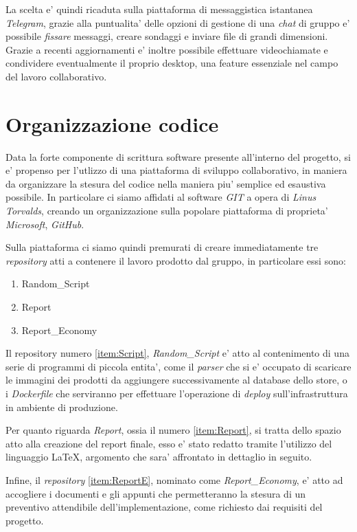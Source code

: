 \documentclass[a4paper]{report}
\begin{document}
		La scelta e' quindi ricaduta sulla piattaforma di messaggistica istantanea \emph{Telegram}, grazie alla
		puntualita' delle opzioni di gestione di una \emph{chat} di gruppo e' possibile \emph{fissare} messaggi, creare
		sondaggi e inviare file di grandi dimensioni. Grazie a recenti aggiornamenti e' inoltre possibile effettuare
		videochiamate e condividere eventualmente il proprio desktop, una feature essenziale nel campo del lavoro
		collaborativo.
	\section{Organizzazione codice}
		Data la forte componente di scrittura software presente all'interno del progetto, si e' propenso per l'utlizzo
		di una piattaforma di sviluppo collaborativo, in maniera da organizzare la stesura del codice nella maniera piu'
		semplice ed esaustiva possibile. In particolare ci siamo affidati al software \emph{GIT} a opera di \emph{Linus
		Torvalds}, creando un organizzazione sulla popolare piattaforma di proprieta' \emph{Microsoft}, \emph{GitHub}.

		Sulla piattaforma ci siamo quindi premurati di creare immediatamente tre \emph{repository} atti a contenere il
		lavoro prodotto dal gruppo, in particolare essi sono:
		\begin{enumerate}
			\item Random\_Script\label{item:Script}
			\item Report\label{item:Report}
			\item Report\_Economy\label{item:ReportE}
		\end{enumerate}

		Il repository numero \ref{item:Script}{, \emph{Random\_Script}} e' atto al contenimento di una serie di
		programmi di piccola entita', come il \emph{parser} che si e' occupato di scaricare le immagini dei prodotti da
		aggiungere successivamente al database dello store, o i \emph{Dockerfile} che serviranno per effettuare l'operazione di \emph{deploy} sull'infrastruttura in ambiente di produzione.

		Per quanto riguarda \emph{Report}, ossia il numero \ref{item:Report}, si tratta dello spazio atto alla creazione
		del report finale, esso e' stato redatto tramite l'utilizzo del linguaggio \LaTeX{}, argomento che sara'
		affrontato in dettaglio in seguito.

		Infine, il \emph{repository} \ref{item:ReportE}, nominato come \emph{Report\_Economy}, e' atto ad accogliere i
		documenti e gli appunti che permetteranno la stesura di un preventivo attendibile dell'implementazione, come
		richiesto dai requisiti del progetto.
\end{document}
